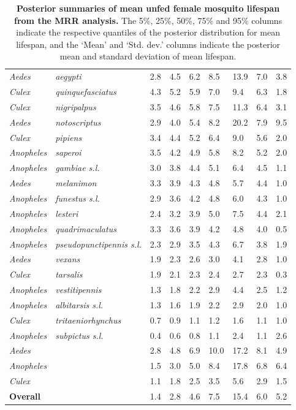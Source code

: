 \documentclass[12pt]{article}
\begin{document}
\begin{table}[htbp]
\begin{tabular}{l|l|l|l|l|l|l|l|l}
		\textit{Aedes} & \textit{aegypti} & 2.8 & 4.5 & 6.2 & 8.5 & 13.9 & 7.0 & 3.8 \\
		\textit{Culex} & \textit{quinquefasciatus} & 4.3 & 5.2 & 5.9 & 7.0 & 9.4 & 6.3 & 1.8 \\
		\textit{Culex} & \textit{nigripalpus} & 3.5 & 4.6 & 5.8 & 7.5 & 11.3 & 6.4 & 3.1 \\
		\textit{Aedes} & \textit{notoscriptus} & 2.9 & 4.0 & 5.4 & 8.2 & 20.2 & 7.9 & 9.5 \\
		\textit{Culex} & \textit{pipiens} & 3.4 & 4.4 & 5.2 & 6.4 & 9.0 & 5.6 & 2.0 \\
		\textit{Anopheles} & \textit{saperoi} & 3.5 & 4.2 & 4.9 & 5.8 & 8.2 & 5.2 & 2.0 \\
		\textit{Anopheles} & \textit{gambiae s.l.} & 3.0 & 3.8 & 4.4 & 5.1 & 6.4 & 4.5 & 1.1 \\
		\textit{Aedes} & \textit{melanimon} & 3.3 & 3.9 & 4.3 & 4.8 & 5.7 & 4.4 & 1.0 \\
		\textit{Anopheles} & \textit{funestus s.l.} & 2.9 & 3.6 & 4.2 & 4.8 & 6.0 & 4.3 & 1.0 \\
		\textit{Anopheles} & \textit{lesteri} & 2.4 & 3.2 & 3.9 & 5.0 & 7.5 & 4.4 & 2.1 \\
		\textit{Anopheles} & \textit{quadrimaculatus} & 3.3 & 3.6 & 3.9 & 4.2 & 4.8 & 4.0 & 0.5 \\
		\textit{Anopheles} & \textit{pseudopunctipennis s.l.} & 2.3 & 2.9 & 3.5 & 4.3 & 6.7 & 3.8 & 1.9 \\
		\textit{Aedes} & \textit{vexans} & 1.9 & 2.3 & 2.6 & 3.0 & 4.1 & 2.8 & 1.0 \\
		\textit{Culex} & \textit{tarsalis} & 1.9 & 2.1 & 2.3 & 2.4 & 2.7 & 2.3 & 0.3 \\
		\textit{Anopheles} & \textit{vestitipennis} & 1.3 & 1.8 & 2.2 & 2.9 & 4.4 & 2.5 & 1.2 \\
		\textit{Anopheles} & \textit{albitarsis s.l.} & 1.3 & 1.6 & 1.9 & 2.2 & 2.9 & 2.0 & 1.0 \\
		\textit{Culex} & \textit{tritaeniorhynchus} & 0.7 & 0.9 & 1.1 & 1.2 & 1.6 & 1.1 & 1.0 \\
		\textit{Anopheles} & \textit{subpictus s.l.} & 0.4 & 0.6 & 0.8 & 1.1 & 2.4 & 1.1 & 2.6 \\
		\hline
		\textit{Aedes} & \text{} & 2.8 & 4.8 & 6.9 & 10.0 & 17.2 & 8.1 & 4.9 \\
		\textit{Anopheles} & \text{} & 1.5 & 3.0 & 5.0 & 8.4 & 17.8 & 6.8 & 6.4 \\
		\textit{Culex} & \text{} & 1.1 & 1.8 & 2.5 & 3.5 & 5.6 & 2.9 & 1.5 \\
		\hline
		\textbf{Overall} & \text{} & 1.4 & 2.8 & 4.6 & 7.5 & 15.4 & 6.0 & 5.2 \\
	\end{tabular}
	\caption{\textbf{Posterior summaries of mean unfed female mosquito lifespan from the MRR analysis.} The 5\%, 25\%, 50\%, 75\% and 95\% columns indicate the respective quantiles of the posterior distribution for mean lifespan, and the `Mean' and `Std. dev.' columns indicate the posterior mean and standard deviation of mean lifespan.}
	\label{tab:mrr_estimated_lifespans}%
\end{table}%
\end{document}
